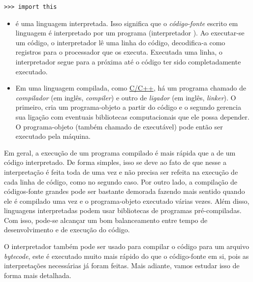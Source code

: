 \begin{lstlisting}
>>> import this
\end{lstlisting}

\begin{itemize}
\item {}

  {\python} é uma linguagem interpretada. Isso significa que o \emph{código-fonte} escrito em linguagem {\python} é interpretado por um programa (interpretador {\python}). Ao executar-se um código, o interpretador lê uma linha do código, decodifica-a como registros para o processador que os executa. Executada uma linha, o interpretador segue para a próxima até o código ter sido completadamente executado.

\item {}

  Em uma linguagem compilada, como \href{https://pt.wikipedia.org/wiki/C\%2B\%2B}{C/C++}, há um programa chamado de \emph{compilador} (em inglês, \textit{compiler}) e outro de \emph{ligador} (em inglês, \textit{linker}). O primeiro, cria um programa-objeto a partir do código e o segundo gerencia sua ligação com eventuais bibliotecas computacionais que ele possa depender. O programa-objeto (também chamado de executável) pode então ser executado pela máquina.
\end{itemize}

Em geral, a execução de um programa compilado é mais rápida que a de um código interpretado. De forma simples, isso se deve ao fato de que nesse a interpretação é feita toda de uma vez e não precisa ser refeita na execução de cada linha de código, como no segundo caso. Por outro lado, a compilação de códigos-fonte grandes pode ser bastante demorada fazendo mais sentido quando ele é compilado uma vez e o programa-objeto executado várias vezes. Além disso, linguagens interpretadas podem usar bibliotecas de programas pré-compiladas. Com isso, pode-se alcançar um bom balanceamento entre tempo de desenvolvimento e de execução do código.

O interpretador {\python} também pode ser usado para compilar o código para um arquivo \emph{bytecode}, este é executado muito mais rápido do que o código-fonte em si, pois as interpretações necessárias já foram feitas. Mais adiante, vamos estudar isso de forma mais detalhada.

